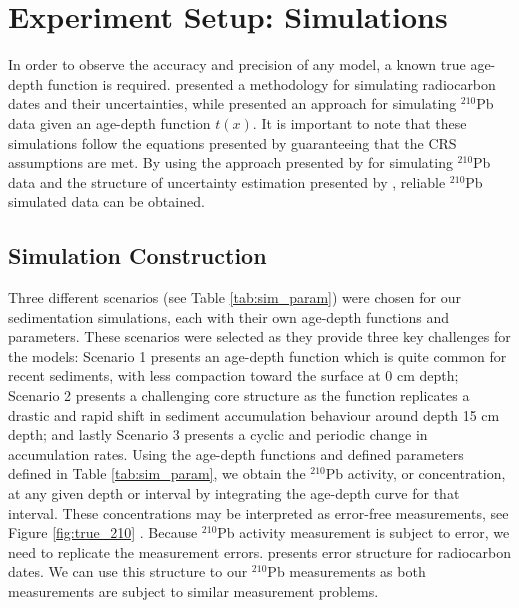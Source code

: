 \documentclass [10pt] {article}
\begin{document}
\section{Experiment Setup: Simulations}

	In order to observe the accuracy and precision of any model, a known true age-depth function is required.
\citet{Blaauw2018} presented a methodology for simulating radiocarbon dates and their uncertainties, while \citet{Aquino2018} presented an approach for simulating $^{210}$Pb data given an age-depth function $t(x)$.
It is important to note that these simulations follow the equations presented by \cite{Appleby1978, Robbins1978} guaranteeing that the CRS assumptions are met. 
By using the approach presented by \citet{Aquino2018} for simulating $^{210}$Pb data and the structure of uncertainty estimation presented by \citet{Blaauw2018}, reliable $^{210}$Pb simulated data can be obtained.

\subsection{Simulation Construction}\label{sec:SimConst}

Three different scenarios (see Table \ref{tab:sim_param}) were chosen for our sedimentation simulations, each with their own age-depth functions and parameters. 
These scenarios were selected as they provide three key challenges for the models: Scenario 1 presents an age-depth function which is quite common for recent sediments, with less compaction toward the surface at 0 cm depth; Scenario 2 presents a challenging core structure as the function replicates a drastic and rapid shift in sediment accumulation behaviour around depth 15 cm depth; and lastly Scenario 3 presents a cyclic and periodic change in accumulation rates. 
Using the age-depth functions and defined parameters defined in Table \ref{tab:sim_param}, we obtain the $^{210}$Pb activity, or concentration, at any given depth or interval by integrating the age-depth curve for that interval.  
These concentrations may be interpreted as error-free measurements, 
see Figure \ref{fig:true_210} . 
Because $^{210}$Pb activity measurement is subject to error, we need to replicate the measurement errors. 
\citet{Blaauw2018} presents error structure for radiocarbon dates. 
We can use this structure to our $^{210}$Pb measurements as both measurements are subject to similar measurement problems. 
\end{document}
